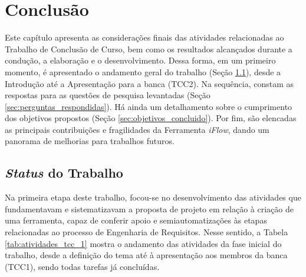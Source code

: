 \chapter[Conclusão]{Conclusão}

\label{chap:consideracoes_finais}

Este capítulo apresenta as considerações finais das atividades relacionadas ao Trabalho de Conclusão de Curso, bem como os resultados alcançados durante a condução, a elaboração e o desenvolvimento. Dessa forma, em um primeiro momento, é apresentado o andamento geral do trabalho (Seção \ref{sec:andamento_do_trabalho}), desde a Introdução até a Apresentação para a banca (TCC2). Na sequência, constam as respostas para as questões de pesquisa levantadas (Seção \ref{sec:perguntas_respondidas}). Há ainda um detalhamento sobre o cumprimento dos objetivos propostos (Seção \ref{sec:objetivos_concluido}). Por fim, são elencadas as principais contribuições e fragilidades da Ferramenta \textit{iFlow}, dando um panorama de melhorias para trabalhos futuros.

\section{\textit{Status} do Trabalho}

\label{sec:andamento_do_trabalho}

Na primeira etapa deste trabalho, focou-se no desenvolvimento das atividades que fundamentavam e sistematizavam a proposta de projeto em relação à criação de uma ferramenta, capaz de conferir apoio e semiautomatizações às etapas relacionadas ao processo de Engenharia de Requisitos. Nesse sentido, a Tabela \ref{tab:atividades_tcc_1} mostra o andamento das atividades da fase inicial do trabalho, desde a definição do tema até à apresentação aos membros da banca (TCC1), sendo todas tarefas já concluídas.

